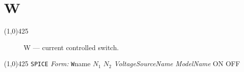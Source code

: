 \oddsidemargin 10mm \topmargin 0.0in \textwidth 5.5in \textheight
7.375in \evensidemargin 1.0in \headheight 0.18in \footskip 0.16in
\section[W \- Current Controlled Switch]{
\hspace{50mm}\huge\textbf{W}} \linethickness{1mm}\line(1,0){425}
\normalsize
\begin{figure}[h]
\centerline{\epsfxsize=2.4in} \caption{W ---
current controlled switch.\label{fig:port}}
\end{figure}
\newline
\linethickness{0.5mm} \line(1,0){425}
\newline
\texttt{SPICE} \textit{Form:}
\newline
{\tt W}name $N_1$ $N_2$ {\it VoltageSourceName ModelName} \B ON\E
\B OFF \E
\newline
\newline
